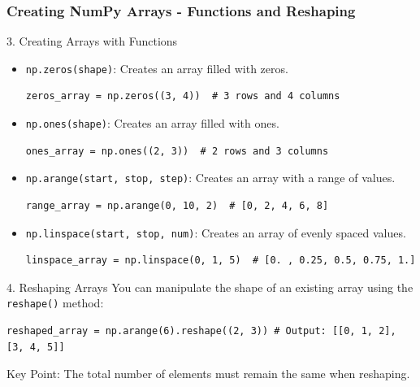 \documentclass{beamer}
\begin{document}
\begin{frame}[fragile]
    \frametitle{Creating NumPy Arrays - Functions and Reshaping}
    \begin{block}{3. Creating Arrays with Functions}
        \begin{itemize}
            \item \texttt{np.zeros(shape)}: Creates an array filled with zeros.
            \begin{lstlisting}
zeros_array = np.zeros((3, 4))  # 3 rows and 4 columns
            \end{lstlisting}

            \item \texttt{np.ones(shape)}: Creates an array filled with ones.
            \begin{lstlisting}
ones_array = np.ones((2, 3))  # 2 rows and 3 columns
            \end{lstlisting}

            \item \texttt{np.arange(start, stop, step)}: Creates an array with a range of values.
            \begin{lstlisting}
range_array = np.arange(0, 10, 2)  # [0, 2, 4, 6, 8]
            \end{lstlisting}
            
            \item \texttt{np.linspace(start, stop, num)}: Creates an array of evenly spaced values.
            \begin{lstlisting}
linspace_array = np.linspace(0, 1, 5)  # [0. , 0.25, 0.5, 0.75, 1.]
            \end{lstlisting}
        \end{itemize}
    \end{block}
    
    \begin{block}{4. Reshaping Arrays}
        You can manipulate the shape of an existing array using the \texttt{reshape()} method:
        \begin{lstlisting}
reshaped_array = np.arange(6).reshape((2, 3)) # Output: [[0, 1, 2], [3, 4, 5]]
        \end{lstlisting}
        Key Point: The total number of elements must remain the same when reshaping.
    \end{block}
\end{frame}
\end{document}
